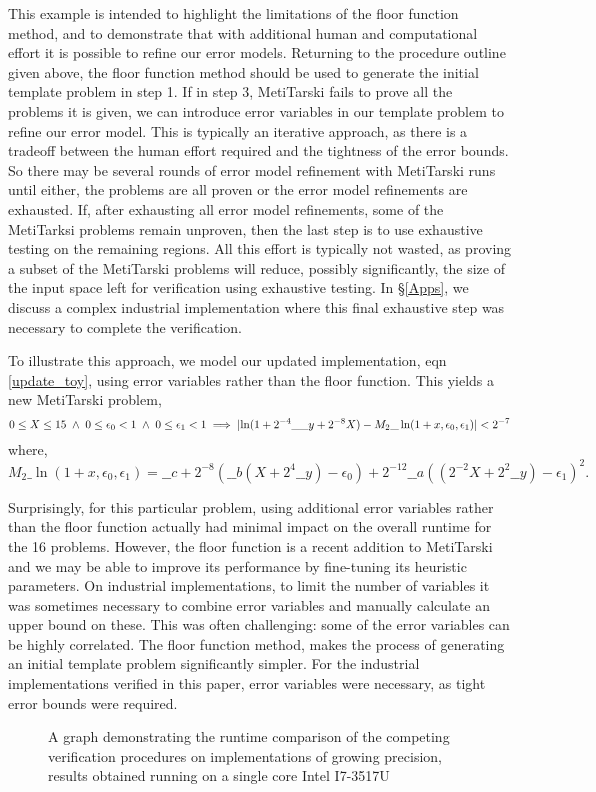 \documentclass{fac}
\newcommand{\abs}[1]{\lvert#1\rvert}
\begin{document}
This example is intended to highlight the limitations of the floor function method, and to demonstrate that with additional human and computational effort it is possible to refine our error models. Returning to the procedure outline given above, the floor function method should be used to generate the initial template problem in step 1. If in step 3, MetiTarski fails to prove all the problems it is given, we can introduce error variables in our template problem to refine our error model. This is typically an iterative approach, as there is a tradeoff between the human effort required and the tightness of the error bounds. So there may be several rounds of error model refinement with MetiTarski runs until either, the problems are all proven or the error model refinements are exhausted. If, after exhausting all error model refinements, some of the MetiTarksi problems remain unproven, then the last step is to use exhaustive testing on the remaining regions. All this effort is typically not wasted, as proving a subset of the MetiTarski problems will reduce, possibly significantly, the size of the input space left for verification using exhaustive testing. In \S \ref{Apps}, we discuss a complex industrial implementation where this final exhaustive step was necessary to complete the verification.

To illustrate this approach, we model our updated implementation, eqn \ref{update_toy}, using error variables rather than the floor function. This yields a new MetiTarski problem,
\[
	0\le X \le 15 \hspace{0.1cm} \land \hspace{0.1cm} 0\le \epsilon_0<1\hspace{0.1cm} \land \hspace{0.1cm} 0\le \epsilon_1<1
	\implies \abs{\ln(1+2^{-4}\_\_y+2^{-8}X) - M_2\_\ln(1+x,\epsilon_0,\epsilon_1)} < 2^{-7}
\]
where, 
\[
M_2\_\ln(1+x,\epsilon_0,\epsilon_1)=\_\_c+2^{-8}(\_\_b(X+2^{4}\_\_y)-\epsilon_0)+2^{-12}\_\_a((2^{-2}X+2^{2}\_\_y)-\epsilon_1)^2.
\]

Surprisingly, for this particular problem, using additional error variables rather than the floor function actually had minimal impact on the overall runtime for the 16 problems. However, the floor function is a recent addition to MetiTarski and we may be able to improve its performance by fine-tuning its heuristic parameters. On industrial implementations, to limit the number of variables it was sometimes necessary to combine error variables and manually calculate an upper bound on these. This was often challenging: some of the error variables can be highly correlated. The floor function method, makes the process of generating an initial template problem significantly simpler. For the industrial implementations verified in this paper, error variables were necessary, as tight error bounds were required.
\begin{figure}
\centering
\scalebox{0.9}{}
\caption{A graph demonstrating the runtime comparison of the competing verification procedures on implementations of growing precision, results obtained running on a single core Intel I7-3517U \label{runtime_graph}}
\end{figure}
\end{document}
